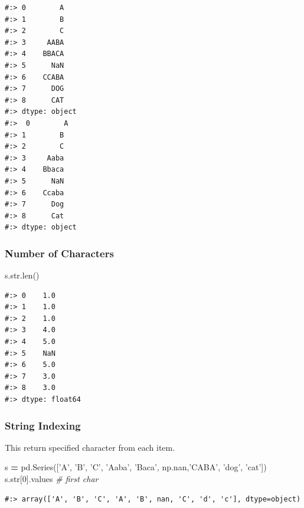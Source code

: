 \documentclass[
]{book}
\newenvironment{Shaded}{\begin{snugshade}}{\end{snugshade}}
\newcommand{\BuiltInTok}[1]{#1}
\newcommand{\CommentTok}[1]{\textcolor[rgb]{0.37,0.37,0.37}{\textit{#1}}}
\newcommand{\DecValTok}[1]{\textcolor[rgb]{0.06,0.06,0.06}{#1}}
\newcommand{\NormalTok}[1]{#1}
\newcommand{\OperatorTok}[1]{\textcolor[rgb]{0.43,0.43,0.43}{\textbf{#1}}}
\newcommand{\StringTok}[1]{\textcolor[rgb]{0.5,0.5,0.5}{#1}}
\begin{document}
\begin{verbatim}
#:> 0        A
#:> 1        B
#:> 2        C
#:> 3     AABA
#:> 4    BBACA
#:> 5      NaN
#:> 6    CCABA
#:> 7      DOG
#:> 8      CAT
#:> dtype: object 
#:>  0        A
#:> 1        B
#:> 2        C
#:> 3     Aaba
#:> 4    Bbaca
#:> 5      NaN
#:> 6    Ccaba
#:> 7      Dog
#:> 8      Cat
#:> dtype: object
\end{verbatim}

\hypertarget{number-of-characters}{%
\subsubsection{Number of Characters}\label{number-of-characters}}

\begin{Shaded}
\begin{Highlighting}[]
\NormalTok{s.}\BuiltInTok{str}\NormalTok{.}\BuiltInTok{len}\NormalTok{()}
\end{Highlighting}
\end{Shaded}

\begin{verbatim}
#:> 0    1.0
#:> 1    1.0
#:> 2    1.0
#:> 3    4.0
#:> 4    5.0
#:> 5    NaN
#:> 6    5.0
#:> 7    3.0
#:> 8    3.0
#:> dtype: float64
\end{verbatim}

\hypertarget{string-indexing}{%
\subsubsection{String Indexing}\label{string-indexing}}

This return specified character from each item.

\begin{Shaded}
\begin{Highlighting}[]
\NormalTok{s }\OperatorTok{=}\NormalTok{ pd.Series([}\StringTok{'A'}\NormalTok{, }\StringTok{'B'}\NormalTok{, }\StringTok{'C'}\NormalTok{, }\StringTok{'Aaba'}\NormalTok{, }\StringTok{'Baca'}\NormalTok{, np.nan,}\StringTok{'CABA'}\NormalTok{, }\StringTok{'dog'}\NormalTok{, }\StringTok{'cat'}\NormalTok{])}
\NormalTok{s.}\BuiltInTok{str}\NormalTok{[}\DecValTok{0}\NormalTok{].values    }\CommentTok{# first char}
\end{Highlighting}
\end{Shaded}

\begin{verbatim}
#:> array(['A', 'B', 'C', 'A', 'B', nan, 'C', 'd', 'c'], dtype=object)
\end{verbatim}
\end{document}
